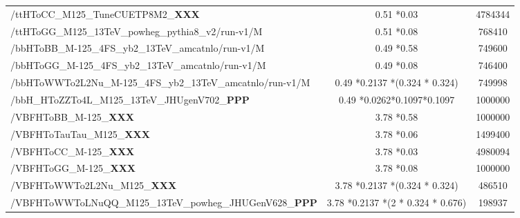 \begin{table}
\begin{adjustbox}{max width=\textwidth}
\begin{tabular}{lcc}
 /ttHToCC\_M125\_TuneCUETP8M2\_{\bf{XXX}}                            & 0.51  *0.03                            &4784344   \\
 /ttHToGG\_M125\_13TeV\_powheg\_pythia8\_v2/run-v1/M                                      & 0.51  *0.08                            &768410    \\\hline
                                                                                                                                             
 /bbHToBB\_M-125\_4FS\_yb2\_13TeV\_amcatnlo/run-v1/M                                      & 0.49  *0.58                            &749600    \\
 /bbHToGG\_M-125\_4FS\_yb2\_13TeV\_amcatnlo/run-v1/M                                      & 0.49  *0.08                            &746400    \\
 /bbHToWWTo2L2Nu\_M-125\_4FS\_yb2\_13TeV\_amcatnlo/run-v1/M                               & 0.49  *0.2137 *(0.324 * 0.324)         &749998    \\
 /bbH\_HToZZTo4L\_M125\_13TeV\_JHUgenV702\_{\bf{PPP}}                               & 0.49  *0.0262*0.1097*0.1097            &1000000   \\\hline
                                                                                                                                                   
 /VBFHToBB\_M-125\_{\bf{XXX}}                                        & 3.78  *0.58                            &1000000   \\
 /VBFHToTauTau\_M125\_{\bf{XXX}}                                     & 3.78  *0.06                            &1499400   \\
 /VBFHToCC\_M-125\_{\bf{XXX}}                                        & 3.78  *0.03                            &4980094   \\
 /VBFHToGG\_M-125\_{\bf{XXX}}                                        & 3.78  *0.08                            &1000000   \\
 /VBFHToWWTo2L2Nu\_M125\_{\bf{XXX}}                                  & 3.78  *0.2137 *(0.324 * 0.324)         &486510   \\ 
 /VBFHToWWToLNuQQ\_M125\_13TeV\_powheg\_JHUGenV628\_{\bf{PPP}}                      & 3.78  *0.2137 *(2 * 0.324 * 0.676)     &198937 \\\hline
 \end{tabular}   
\end{adjustbox}
\end{table}
                                                                                                                                         
